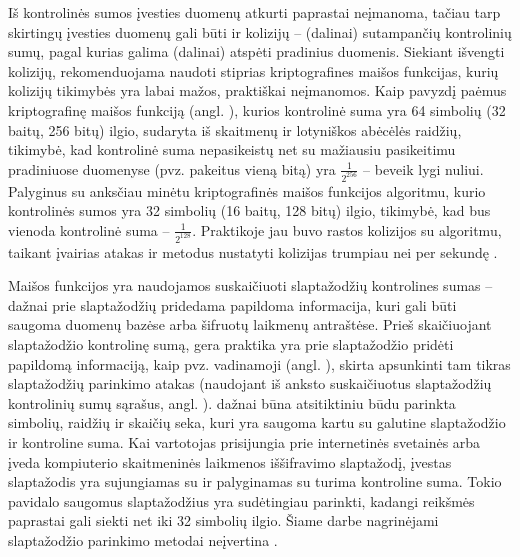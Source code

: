 \documentclass{VUMIFInfBakalaurinis}
\begin{document}
Iš kontrolinės sumos įvesties duomenų atkurti paprastai neįmanoma, tačiau tarp 
skirtingų įvesties duomenų gali būti ir kolizijų -- (dalinai) sutampančių 
kontrolinių sumų, pagal kurias galima (dalinai) atspėti pradinius duomenis. 
Siekiant išvengti kolizijų, rekomenduojama naudoti stiprias kriptografines 
maišos funkcijas, kurių kolizijų tikimybės yra labai mažos, praktiškai 
neįmanomos. Kaip pavyzdį paėmus  kriptografinę maišos 
funkciją (angl. ), kurios kontrolinė 
suma yra 64 simbolių (32 baitų, 256 bitų) ilgio, sudaryta iš skaitmenų ir 
lotyniškos abėcėlės raidžių, tikimybė, kad kontrolinė suma nepasikeistų net su 
mažiausiu pasikeitimu pradiniuose duomenyse (pvz. pakeitus vieną bitą) yra 
$\frac{1}{2^{256}}$ -- beveik lygi nuliui. Palyginus su anksčiau minėtu 
 kriptografinės maišos funkcijos algoritmu, kurio kontrolinės 
sumos yra 32 simbolių (16 baitų, 128 bitų) ilgio, tikimybė, kad bus vienoda 
kontrolinė suma -- $\frac{1}{2^{128}}$. Praktikoje jau buvo rastos kolizijos su 
 algoritmu, taikant įvairias atakas ir metodus nustatyti 
kolizijas trumpiau nei per sekundę \cite{BreakMD5,MD5Attacks}.

Maišos funkcijos yra naudojamos suskaičiuoti slaptažodžių kontrolines sumas -- 
dažnai prie slaptažodžių pridedama papildoma informacija, kuri gali būti saugoma 
duomenų bazėse arba šifruotų laikmenų antraštėse. Prieš skaičiuojant 
slaptažodžio kontrolinę sumą, gera praktika yra prie slaptažodžio pridėti 
papildomą informaciją, kaip pvz. vadinamoji  (angl. 
), skirta apsunkinti tam tikras slaptažodžių parinkimo atakas 
(naudojant iš anksto suskaičiuotus slaptažodžių kontrolinių sumų sąrašus, angl. 
).  dažnai būna atsitiktiniu būdu
parinkta simbolių, raidžių ir skaičių seka, kuri yra saugoma kartu su galutine 
slaptažodžio ir  kontroline suma. Kai vartotojas prisijungia 
prie internetinės svetainės arba įveda kompiuterio skaitmeninės laikmenos 
iššifravimo slaptažodį, įvestas slaptažodis yra sujungiamas su 
 ir palyginamas su turima kontroline suma. Tokio pavidalo 
saugomus slaptažodžius yra sudėtingiau parinkti, kadangi  
reikšmės paprastai gali siekti net iki 32 simbolių ilgio. Šiame darbe 
nagrinėjami slaptažodžio parinkimo metodai neįvertina .
\end{document}
